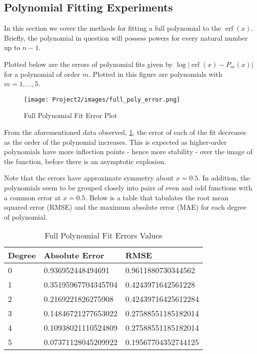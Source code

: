 \documentclass[10pt,a4paper]{article}
\DeclareMathOperator\erf{erf}
\begin{document}
\subsection*{Polynomial Fitting Experiments}

In this section we cover the methods for fitting a full polynomial to the $\erf{(x)}$. Briefly, the polynomial in question will possess powers for every natural number up to $n - 1$.

Plotted below are the errors of polynomial fits given by $\log \left| \erf{(x)} - P_m(x) \right|$ for a polynomial of order $m$. Plotted in this figure are polynomials with $m = 1, ..., 5$.


\begin{figure}[H]
\texttt{[image: Project2/images/full\_poly\_error.png]}
\centering
\caption{Full Polynomial Fit Error Plot}
\label{fig: fullerror}
\end{figure}

From the aforementioned data observed, \cref{fig: fullerror}, the error of each of the fit decreases as the order of the polynomial increases. This is expected as higher-order polynomials have more inflection points - hence more stability - over the image of the function, before there is an asymptotic explosion.

Note that the errors have approximate symmetry about $x=0.5$. In addition, the polynomials seem to be grouped closely into pairs of even and odd functions with a common error at $x=0.5$. Below is a table that tabulates the root mean squared error (RMSE) and the maximum absolute error (MAE) for each degree of polynomial. 

\begin{table}
\centering
\begin{tabular}{l|l|l}
Degree & Absolute Error     & RMSE                \\ \hline
0      & 0.936952448494691  & 0.9611880730344562  \\
1      & 0.35195967704345704  & 0.4243971642561228  \\
2      & 0.2169221826275908  & 0.42439716425612284 \\
3      & 0.14846721277653022  & 0.27588551185182014 \\
4      & 0.10938021110524809  & 0.27588551185182014 \\
5      & 0.07371128045209922 & 0.19567704352744125
\end{tabular}
\caption{Full Polynomial Fit Errors Values}
\label{table: fullerrors}
\end{table}
\end{document}
